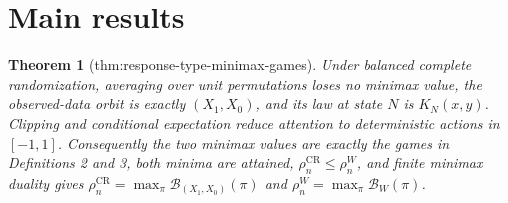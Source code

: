 \documentclass{article}
\newtheorem{theorem}{Theorem}
\begin{document}
\section{Main results}

\begin{theorem}[thm:response-type-minimax-games]\label{thm:response-type-minimax-games}
Under balanced complete randomization, averaging over unit permutations loses no minimax value, the observed-data orbit is exactly \((X_1,X_0)\), and its law at state \(N\) is \(K_N(x,y)\). Clipping and conditional expectation reduce attention to deterministic actions in \([-1,1]\). Consequently the two minimax values are exactly the games in Definitions 2 and 3, both minima are attained, \(\rho_n^{\mathrm{CR}}\le\rho_n^W\), and finite minimax duality gives \(\rho_n^{\mathrm{CR}}=\max_{\pi}\mathcal B_{(X_1,X_0)}(\pi)\) and \(\rho_n^W=\max_{\pi}\mathcal B_W(\pi)\).
\end{theorem}
\end{document}
